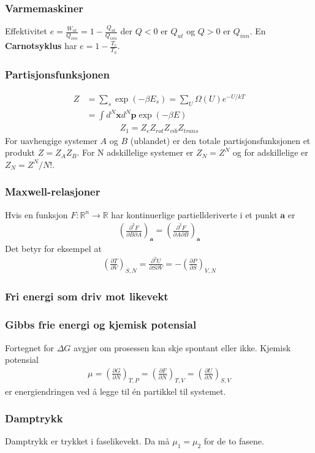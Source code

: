 \documentclass[a4paper, norsk, 10pt]{article}
\newcommand{\EQU}[1] { \begin{equation*} \begin{split}
#1  
\end{split} \end{equation*} }
\newcommand{\PAR}[2]{ \frac{\partial #1}{\partial #2}}
\begin{document}
\begin{multicols*}{2}
\subsubsection*{Varmemaskiner}
Effektivitet $e=\frac{W_{ut}}{Q_{inn}}=1-\frac{Q_{ut}}{Q_{inn}}$ der $Q<0$ er $Q_{ut}$ og $Q>0$ er $Q_{inn}$. En \textbf{Carnotsyklus} har $e=1-\frac{T_c}{T_h}$.


\subsubsection*{Partisjonsfunksjonen}
\EQU{
Z &= \sum_s \exp\left( -\beta E_s \right) = \sum_U \Omega(U)e^{-U/kT} \\
&= \int d^N \mathbf{x} d^N \mathbf{p} \exp \left( -\beta E \right)
}
\EQU{
Z_{1} = Z_{e}Z_{rot}Z_{vib}Z_{trans} 
}
For uavhengige systemer $A$ og $B$ (ublandet) er den totale partisjonsfunksjonen et produkt $Z=Z_AZ_B$. For N adskillelige systemer er $Z_N = Z^N$ og for adskillelige er $Z_N = Z^N/N!$.


\subsubsection*{Maxwell-relasjoner}
Hvis en funksjon $F:\mathbb{R}^n\rightarrow \mathbb{R}$ har kontinuerlige partiellderiverte i et punkt $\mathbf{a}$ er
\EQU{
\left(\PAR{^2F}{B\partial A}\right)_\mathbf{a} = \left(\PAR{^2F}{A\partial B}\right)_\mathbf{a}
}
Det betyr for eksempel at
\EQU{
\left(\PAR{T}{V}\right)_{S,N} = \PAR{^2U}{S\partial V} = -\left(\PAR{P}{S}\right)_{V,N}
}

\subsubsection*{Fri energi som driv mot likevekt}



\subsubsection*{Gibbs frie energi og kjemisk potensial}
Fortegnet for $\Delta G$ avgjør om prosessen kan skje spontant eller ikke. Kjemisk potensial
\EQU{
\mu = \left(\PAR{G}{N}\right)_{T,P} = \left(\PAR{F}{N}\right)_{T,V} = \left(\PAR{U}{N}\right)_{S,V} 
}
er energiendringen ved å legge til én partikkel til systemet. 


\subsubsection*{Damptrykk}
Damptrykk er trykket i faselikevekt. Da må $\mu_1=\mu_2$ for de to fasene. 


\end{multicols*}
\end{document}
